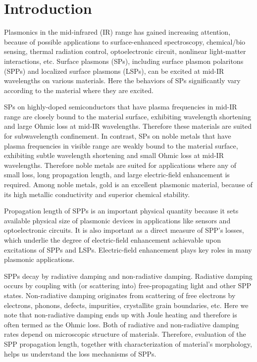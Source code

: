 \documentclass[aip,apl,reprint]{revtex4-1}
\begin{document}
\section{Introduction}
Plasmonics in the mid-infrared (IR) range has gained increasing attention,\cite{Stanley, Law} because of possible applications to surface-enhanced spectroscopy,\cite{Neubrech, Hoang} chemical/bio sensing,\cite{Cleary2008} thermal radiation control,\cite{Kusunoki} optoelectronic circuit,\cite{Ebbesen, Soref} nonlinear light-matter interactions,\cite{Kusa2015} etc. Surface plasmons (SPs), including surface plasmon polaritons (SPPs) and localized surface plasmons (LSPs), can be excited at mid-IR wavelengths on various materials.\cite{Law} Here the behaviors of SPs significantly vary according to the material where they are excited.\cite{Law} 

SPs on highly-doped semiconductors that have plasma frequencies in mid-IR range are closely bound to the material surface, exhibiting wavelength shortening and large Ohmic loss at mid-IR wavelengths. Therefore these materials are suited for subwavelength confinement. In contrast, SPs on noble metals that have plasma frequencies in visible range are weakly bound to the material surface, exhibiting subtle wavelength shortening and small Ohmic loss at mid-IR wavelengths. Therefore noble metals are suited for applications where any of small loss, long propagation length, and large electric-field enhancement is required.\cite{Law, Kusa2014}
Among noble metals, gold is an excellent plasmonic material, because of its high metallic conductivity and superior chemical stability.\cite{Zayats}

Propagation length of SPPs is an important physical quantity\cite{Kuttge, Peale2008} because it sets available physical size of plasmonic devices in applications like sensors and optoelectronic circuits. It is also important as a direct measure of SPP's losses, which underlie the degree of electric-field enhancement achievable upon excitations of SPPs and LSPs. Electric-field enhancement plays key roles in many plasmonic applications.


SPPs decay by radiative damping and non-radiative damping. Radiative damping occurs by coupling with (or scattering into) free-propagating light and other SPP states. Non-radiative damping originates from scattering of free electrons by electrons, phonons, defects, impurities, crystallite grain boundaries, etc.\cite{Yang} Here we note that non-radiative damping ends up with Joule heating and therefore is often termed as the Ohmic loss.\cite{Kuttge} 
Both of radiative and non-radiative damping rates depend on microscopic structure of materials. Therefore, evaluation of the SPP propagation length, together with characterization of material's morphology, helps us understand the loss mechanisms of SPPs.
\end{document}
